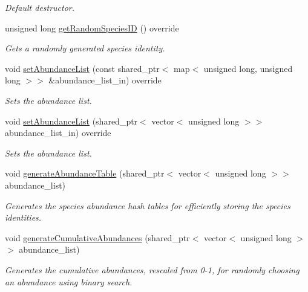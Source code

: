 \begin{DoxyCompactItemize}
\begin{DoxyCompactList}\small\item\em Default destructor. \end{DoxyCompactList}\item 
unsigned long \hyperlink{class_simulated_species_abundances_handler_a3a06a9f8d09d6c90472ec4cc7f2cfe55}{get\+Random\+Species\+ID} () override
\begin{DoxyCompactList}\small\item\em Gets a randomly generated species identity. \end{DoxyCompactList}\item 
void \hyperlink{class_simulated_species_abundances_handler_a762ef5787578666171b4e27bda446421}{set\+Abundance\+List} (const shared\+\_\+ptr$<$ map$<$ unsigned long, unsigned long $>$$>$ \&abundance\+\_\+list\+\_\+in) override
\begin{DoxyCompactList}\small\item\em Sets the abundance list. \end{DoxyCompactList}\item 
void \hyperlink{class_simulated_species_abundances_handler_a8d7b8017421357298cdce364d85b6963}{set\+Abundance\+List} (shared\+\_\+ptr$<$ vector$<$ unsigned long $>$$>$ abundance\+\_\+list\+\_\+in) override
\begin{DoxyCompactList}\small\item\em Sets the abundance list. \end{DoxyCompactList}\item 
void \hyperlink{class_simulated_species_abundances_handler_a5330503373c2fc7a0374b929a0a15fc7}{generate\+Abundance\+Table} (shared\+\_\+ptr$<$ vector$<$ unsigned long $>$$>$ abundance\+\_\+list)
\begin{DoxyCompactList}\small\item\em Generates the species abundance hash tables for efficiently storing the species identities. \end{DoxyCompactList}\item 
void \hyperlink{class_simulated_species_abundances_handler_a0429f070f77d6f334fe2b249b959df5d}{generate\+Cumulative\+Abundances} (shared\+\_\+ptr$<$ vector$<$ unsigned long $>$$>$ abundance\+\_\+list)
\begin{DoxyCompactList}\small\item\em Generates the cumulative abundances, rescaled from 0-\/1, for randomly choosing an abundance using binary search. \end{DoxyCompactList}\item 

\end{DoxyCompactItemize}
